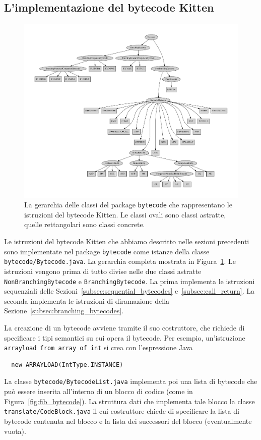 \subsection{L'implementazione del bytecode Kitten}
  \label{subsec:bytecode_implementation}
%
\begin{figure}[t]
\begin{center}
\includegraphics[width=15.5cm]{bytecodes_hierarchy.pdf}
\end{center}
\caption{La gerarchia delle classi del package \texttt{bytecode} che rappresentano le istruzioni del bytecode Kitten. Le classi ovali sono classi astratte, quelle rettangolari sono classi concrete.}
  \label{fig:bytecodes_hierarchy}
\end{figure}
%
Le istruzioni del bytecode Kitten che abbiamo descritto nelle sezioni
precedenti sono implementate nel package \texttt{bytecode}
come istanze della classe \texttt{bytecode/Bytecode.java}.
La gerarchia completa \e mostrata in Figura~\ref{fig:bytecodes_hierarchy}.
Le istruzioni vengono prima di tutto divise nelle due classi astratte
\texttt{NonBranchingBytecode} e \texttt{BranchingBytecode}.
La prima implementa le istruzioni sequenziali
delle Sezioni~\ref{subsec:sequential_bytecodes}
e~\ref{subsec:call_return}. La seconda implementa le istruzioni di
diramazione della Sezione~\ref{subsec:branching_bytecodes}.

La creazione di un bytecode avviene tramite il suo costruttore, che
richiede di specificare i tipi semantici su cui opera il bytecode.
Per esempio, un'istruzione \texttt{arrayload from array of int} si
crea con l'espressione Java
%
\begin{verbatim}
  new ARRAYLOAD(IntType.INSTANCE)
\end{verbatim}
%
La classe \texttt{bytecode/BytecodeList.java} implementa poi una lista
di bytecode che pu\`o essere inserita all'interno di un blocco di codice
(come in Figura~\ref{fig:fib_bytecode}). La struttura dati che implementa
tale blocco \e la classe \texttt{translate/CodeBlock.java} il cui costruttore
chiede di specificare la lista di bytecode contenuta nel blocco e la lista
dei successori del blocco (eventualmente vuota).

